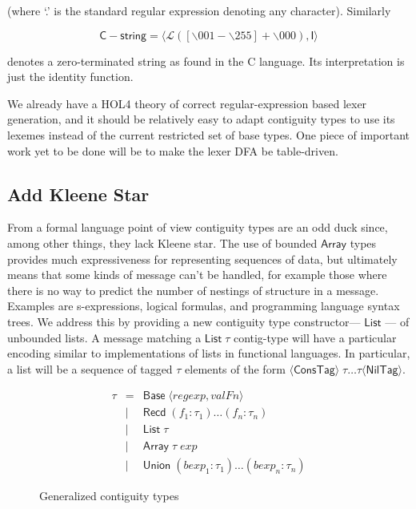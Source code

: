 \documentclass{article}
\newcommand{\konst}[1]{\ensuremath{\mathsf{#1}}}
\newcommand{\Lang}[1]{\ensuremath{{\mathcal L}({#1})}}
\newcommand{\Angled}[1]{\ensuremath{\langle {#1} \rangle}}
\begin{document}
  (where `.' is the standard regular expression denoting any character). Similarly

  \[ \konst{C-string} = \langle \Lang{[\backslash 001-\backslash 255]+ \backslash 000}, \konst{I} \rangle
  \]

  denotes a zero-terminated string as found in the C language. Its
  interpretation is just the identity function.

  We already have a HOL4 theory of correct regular-expression based
  lexer generation, and it should be relatively easy to adapt
  contiguity types to use its lexemes instead of the current
  restricted set of base types. One piece of important work yet to be
  done will be to make the lexer DFA be table-driven.

 \subsection*{Add Kleene Star}
  From a formal language point of view contiguity types are an odd
  duck since, among other things, they lack Kleene star. The use of
  bounded \konst{Array} types provides much expressiveness for
  representing sequences of data, but ultimately means that some kinds
  of message can't be handled, for example those where there is no way
  to predict the number of nestings of structure in a
  message. Examples are s-expressions, logical formulas, and
  programming language syntax trees. We address this by providing a
  new contiguity type constructor--- \konst{List} --- of unbounded
  lists. A message matching a $\konst{List}\;\tau$ contig-type will
  have a particular encoding similar to implementations of lists in
  functional languages. In particular, a list will be a sequence of
  tagged $\tau$ elements of the form $\Angled{\konst{ConsTag}}\; \tau
  \ldots \tau \Angled{\konst{NilTag}}$.


\begin{figure}
\[
\begin{array}{rcl}
 \tau & =    & \konst{Base}\; \langle \mathit{regexp}, \mathit{valFn} \rangle \\
      & \mid & \konst{Recd}\; (f_1 : \tau_1) \ldots (f_n : \tau_n) \\
      & \mid & \konst{List}\; \tau \\
      & \mid & \konst{Array}\; \tau \; \mathit{exp} \\
      & \mid & \konst{Union}\; (\mathit{bexp}_1 : \tau_1) \ldots (\mathit{bexp}_n : \tau_n)
\end{array}
\]
\label{gen-contig-types}
\caption{Generalized contiguity types}
\end{figure}
\end{document}
